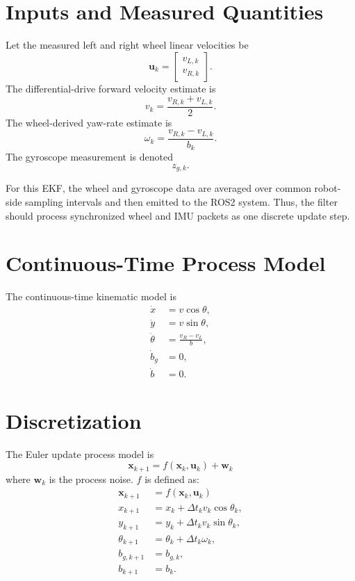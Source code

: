 \documentclass[11pt]{article}
\begin{document}
\section{Inputs and Measured Quantities}

Let the measured left and right wheel linear velocities be
\begin{equation}
\mathbf{u}_k =
\begin{bmatrix}
v_{L,k} \\
v_{R,k}
\end{bmatrix}.
\end{equation}
The differential-drive forward velocity estimate is
\begin{equation}
v_k =
\frac{v_{R,k}+v_{L,k}}{2}.
\end{equation}
The wheel-derived yaw-rate estimate is
\begin{equation}
\omega_k =
\frac{v_{R,k}-v_{L,k}}{b_k}.
\end{equation}
The gyroscope measurement is denoted
\begin{equation}
z_{g,k}.
\end{equation}

For this EKF, the wheel and gyroscope data are averaged over
common robot-side sampling intervals and then emitted to the ROS2 system.
Thus, the filter should process synchronized wheel and IMU packets as
one discrete update step.

\section{Continuous-Time Process Model}

The continuous-time kinematic model is
\begin{align}
\dot{x} &= v \cos\theta, \\
\dot{y} &= v \sin\theta, \\
\dot{\theta} &= \frac{v_R-v_L}{b}, \\
\dot{b}_g &= 0, \\
\dot{b} &= 0.
\end{align}


\section{Discretization}

The Euler update process model is
\begin{equation}
\mathbf{x}_{k+1} = f(\mathbf{x}_k, \mathbf{u}_k) + \textbf{w}_k
\end{equation}
where $\textbf{w}_k$ is the process noise. $f$ is defined as:
\begin{align}
\mathbf{x}_{k+1}&= f(\mathbf{x}_k, \mathbf{u}_k)
\\
x_{k+1}
&=
x_k
+
\Delta t_k
v_k
\cos\theta_k,
\\
y_{k+1}
&=
y_k
+
\Delta t_k
v_k
\sin\theta_k,
\\
\theta_{k+1}
&=
\theta_k
+
\Delta t_k
\omega_k,
\\
b_{g,k+1}
&=
b_{g,k},
\\
b_{k+1}
&=
b_k.
\end{align}
\end{document}
